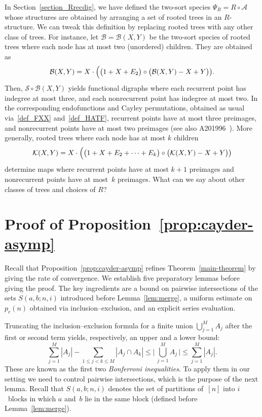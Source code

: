 \documentclass[a4paper,11pt,UKenglish]{article}
\newcommand{\Set}{E}
\newcommand{\Sym}{\mathcal{S}}
\newcommand{\rtree}{\mathcal{A}}
\newcommand{\btree}{\mathcal{B}}
\theoremstyle{definition}
\begin{document}
In Section~\ref{section_Rrecdig}, we have defined the two-sort species
$\Psi_R=R\circ\rtree$ whose structures are obtained by arranging
a set of rooted trees in an $R$-structure.
We can tweak this definition by replacing rooted trees with any
other class of trees. For instance, let $\btree=\btree(X,Y)$ be the
two-sort species of rooted trees
where each node has at most two (unordered) children. They are
obtained as
$$
\btree(X,Y) =
X\cdot \Bigl(\bigl( 1 + X + \Set_2\bigr) \circ \bigl(\btree(X,Y) - X + Y\bigr)\bigr).
$$
Then, $\Sym\circ\btree(X,Y)$ yields functional digraphs where each
recurrent point has indegree at most three, and each nonrecurrent
point has indegree at most two.
In the corresponding endofunctions and Cayley permutations, obtained
as usual via~\eqref{def_FXX} and~\eqref{def_HATF}, recurrent points
have at most three preimages, and nonrecurrent points have at most
two preimages (see also A201996~\cite{Sl}).
More generally, rooted trees where each node has at most $k$ children
$$
\mathcal{K}(X,Y) =
X\cdot \Bigl(\bigl( 1 + X + \Set_2 + \cdots + \Set_k\bigr) \circ \bigl(\mathcal{K}(X,Y) - X + Y\bigr)\bigr)
$$
determine maps where recurrent points have at most $k+1$ preimages
and nonrecurrent points have at most~$k$ preimages.
What can we say about other classes of trees and choices of $R$?

\appendix

\section{Proof of Proposition~\ref{prop:cayder-asymp}}\label{appendix_asymp}

Recall that Proposition~\ref{prop:cayder-asymp} refines
Theorem~\ref{main-theorem} by giving the rate of convergence.
We establish five preparatory lemmas before giving the proof.
The key ingredients are a bound on pairwise intersections of the
sets $S(a,b;n,i)$ introduced before Lemma~\ref{lem:merge},
a uniform estimate on~$p_r(n)$ obtained via inclusion--exclusion,
and an explicit series evaluation.

Truncating the inclusion--exclusion formula for a finite union
$\bigcup_{j=1}^{M} A_j$ after the first or second term yields,
respectively, an upper and a lower bound:
\[
  \sum_{j=1}^{M} |A_j| - \sum_{1 \leq j < k \leq M} |A_j \cap A_k|
  \leq \biggl|\,\bigcup_{j=1}^{M} A_j\,\biggr|
  \leq \sum_{j=1}^{M} |A_j|.
\]
These are known as the first two \emph{Bonferroni inequalities}.
To apply them in our setting we need to control pairwise
intersections, which is the purpose of the next lemma.
Recall that $S(a,b;n,i)$ denotes the set of partitions of~$[n]$
into $i$~blocks in which $a$ and~$b$ lie in the same block
(defined before Lemma~\ref{lem:merge}).
\end{document}
